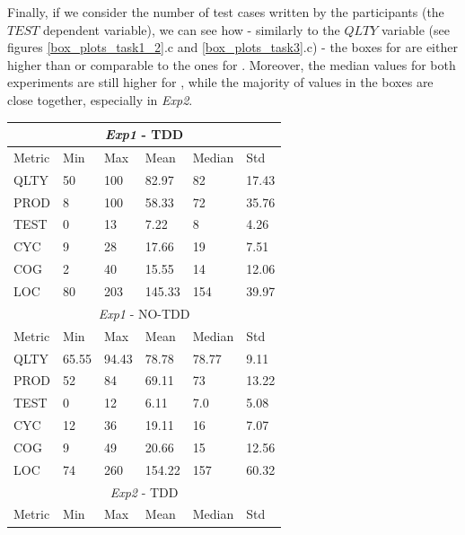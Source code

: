 Finally, if we consider the number of test cases written by the participants (\ie the $TEST$ dependent variable), we can see how - similarly to the $QLTY$ variable  (see figures \ref{box_plots_task1_2}.c and \ref{box_plots_task3}.c) - the boxes for \tdd are either higher than or comparable to the ones for \notdd. Moreover, the median values for both experiments are still higher for \tdd, while the majority of values in the boxes are close together, especially in \textit{Exp2}.


\begin{table}[H]
    \begin{center} 
        \begin{tabular}{ |p{2cm}||p{1.6cm}|p{1.6cm}|p{1.6cm}|p{1.6cm}|p{1.6cm}|}
            \hline
                \multicolumn{6}{|c|}{\textit{Exp1} - TDD} \\
            \hline
                Metric & Min & Max & Mean & Median & Std\\
            \hline
                QLTY & 50 & 100 & 82.97 & 82 & 17.43 \\
                PROD & 8 & 100 & 58.33 & 72 & 35.76 \\
                TEST & 0 & 13 & 7.22 & 8 & 4.26 \\
                CYC & 9 & 28 & 17.66 & 19 & 7.51 \\
                COG & 2 & 40 & 15.55 & 14 & 12.06 \\
                LOC & 80 & 203 & 145.33 & 154 & 39.97 \\
            \hline\hline
                \multicolumn{6}{|c|}{\textit{Exp1} - NO-TDD} \\
            \hline
                Metric & Min & Max & Mean & Median & Std\\
            \hline
                QLTY & 65.55 & 94.43 & 78.78 & 78.77 & 9.11 \\
                PROD & 52 & 84 & 69.11 & 73 & 13.22 \\
                TEST & 0 & 12 & 6.11 & 7.0 & 5.08 \\
                CYC & 12 & 36 & 19.11 & 16 & 7.07 \\
                COG & 9 & 49 & 20.66 & 15 & 12.56 \\
                LOC & 74 & 260 & 154.22 & 157 & 60.32 \\
            \hline
            \hline
                \multicolumn{6}{|c|}{\textit{Exp2} - TDD} \\
            \hline
                Metric & Min & Max & Mean & Median & Std\\

\end{tabular}
\end{center}
\end{table}
